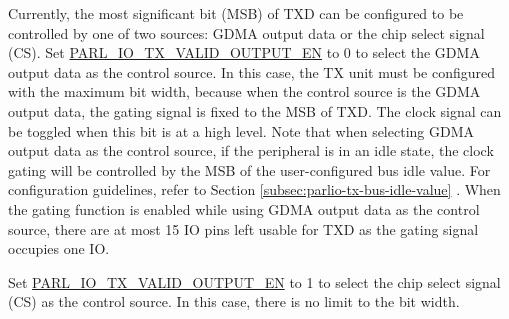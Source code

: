 \documentclass[main\_\_EN.tex]{subfiles}
\begin{document}
{Currently, the most significant bit (MSB) of TXD can be configured to be controlled by one of two sources: GDMA output data or the chip select signal (CS). Set \hyperref[fielddesc:PARLIOTXVALIDOUTPUTEN]{PARL\_IO\_TX\_VALID\_OUTPUT\_EN} to 0 to select the GDMA output data as the control source. In this case, the TX unit must be configured with the maximum bit width, because when the control source is the GDMA output data, the gating signal is fixed to the MSB of TXD. The clock signal can be toggled when this bit is at a high level. Note that when selecting GDMA output data as the control source, if the peripheral is in an idle state, the clock gating will be controlled by the MSB of the user-configured bus idle value. For configuration guidelines, refer to Section \ref{subsec:parlio-tx-bus-idle-value} . When the gating function is enabled while using GDMA output data as the control source, there are at most 15 IO pins left usable for TXD as the gating signal occupies one IO.

Set \hyperref[fielddesc:PARLIOTXVALIDOUTPUTEN]{PARL\_IO\_TX\_VALID\_OUTPUT\_EN} to 1 to select the chip select signal (CS) as the control source. In this case, there is no limit to the bit width.
}
\end{document}
